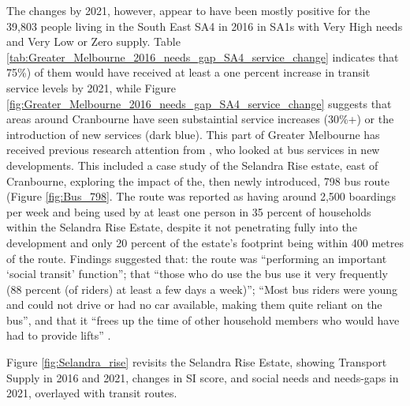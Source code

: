 \documentclass[preprint, 3p,
authoryear]{elsarticle} %
\begin{document}
The changes by 2021, however, appear to have been mostly positive for
the 39,803 people living in the South East SA4 in 2016 in SA1s with Very
High needs and Very Low or Zero supply. Table
\ref{tab:Greater_Melbourne_2016_needs_gap_SA4_service_change} indicates
that 75\%) of them would have received at least a one percent increase
in transit service levels by 2021, while Figure
\ref{fig:Greater_Melbourne_2016_needs_gap_SA4_service_change} suggests
that areas around Cranbourne have seen substaintial service increases
(30\%+) or the introduction of new services (dark blue). This part of
Greater Melbourne has received previous research attention from
\citet{delbosc2015impact}, who looked at bus services in new
developments. This included a case study of the Selandra Rise estate,
east of Cranbourne, exploring the impact of the, then newly introduced,
798 bus route (Figure \ref{fig:Bus_798}. The route was reported as
having around 2,500 boardings per week and being used by at least one
person in 35 percent of households within the Selandra Rise Estate,
despite it not penetrating fully into the development and only 20
percent of the estate's footprint being within 400 metres of the route.
Findings suggested that: the route was ``performing an important `social
transit' function''; that ``those who do use the bus use it very
frequently (88 percent (of riders) at least a few days a week)''; ``Most
bus riders were young and could not drive or had no car available,
making them quite reliant on the bus'', and that it ``frees up the time
of other household members who would have had to provide lifts''
\citep[p.10]{delbosc2015impact}.

Figure \ref{fig:Selandra_rise} revisits the Selandra Rise Estate,
showing Transport Supply in 2016 and 2021, changes in SI score, and
social needs and needs-gaps in 2021, overlayed with transit routes.
\end{document}
